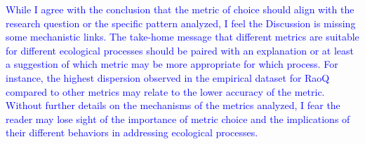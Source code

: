 \documentclass[
]{article}
\begin{document}


\textcolor{blue}{While I agree with the conclusion that the metric of choice should align with the research question or the specific pattern analyzed, I feel the Discussion is missing some mechanistic links.
The take-home message that different metrics are suitable for different ecological processes should be paired with an explanation or at least a suggestion of which metric may be more appropriate for which process.
For instance, the highest dispersion observed in the empirical dataset for RaoQ compared to other metrics may relate to the lower accuracy of the metric.
Without further details on the mechanisms of the metrics analyzed, I fear the reader may lose sight of the importance of metric choice and the implications of their different behaviors in addressing ecological processes.}
\end{document}
